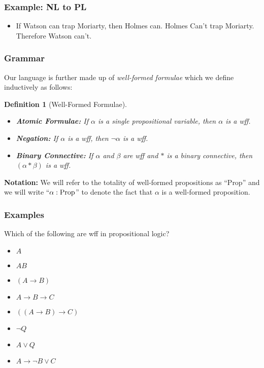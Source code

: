 \documentclass{beamer}
\theoremstyle{indentDefn} \newtheorem{defn}[]{Definition}
\begin{document}
\begin{frame}
	\frametitle{Example: NL to PL}
	\begin{itemize}
		\item If Watson can trap Moriarty, then Holmes can. Holmes Can't trap Moriarty. Therefore Watson can't.
	\end{itemize}
	
	\vspace{5cm}
	
	
\end{frame}	

\begin{frame}
	\frametitle{Grammar}
	
	Our language is further made up of \emph{well-formed formulae} which we define inductively as follows:	
	
	\vspace{0.5cm}
	\begin{defn}[Well-Formed Formulae]
	\begin{itemize}
		\item {\bf Atomic Formulae:} If $\alpha$ is a single propositional variable, then $\alpha$ is a wff.
		\item {\bf Negation:} If $\alpha$ is a wff, then $\lnot\alpha$ is a wff. 
		\item {\bf Binary Connective:} If $\alpha$ and $\beta$ are wff and $*$ is a binary connective, then $(\alpha * \beta)$ is a wff. 		
	\end{itemize}
	\end{defn}
	
	{\bf Notation:} We will refer to the totality of well-formed propositions as ``Prop'' and we will write ``$\alpha : \text{Prop}$'' to denote the fact that $\alpha$ is a well-formed proposition. 
	
\end{frame}

\begin{frame}
	\frametitle{Examples}
	Which of the following are wff in propositional logic?
	
	\begin{itemize}
		\item[1.] $A$
		\item[2.] $AB$
		\item[3.] $(A \rightarrow B)$
		\item[4.] $A \rightarrow B \rightarrow C$
		\item[5.] $((A \rightarrow B) \rightarrow C)$
		\item[6.] $\lnot Q$
		\item[7.] $A \lor Q$
		\item[8.] $A \rightarrow \lnot B \lor C$		
	\end{itemize}
\end{frame}
\end{document}
